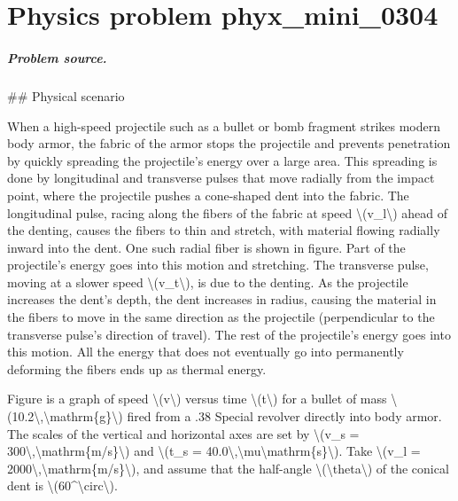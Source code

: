 
\chapter{Physics problem phyx\_mini\_0304}
\label{ch:PhyXMiniProblems_problem_phyx_mini_0304}

\paragraph{Problem source.}
\#\# Physical scenario

When a high-speed projectile such as a bullet or bomb fragment strikes modern body armor, the fabric of the armor stops the projectile and prevents penetration by quickly spreading the projectile's energy over a large area. This spreading is done by longitudinal and transverse pulses that move radially from the impact point, where the projectile pushes a cone-shaped dent into the fabric. The longitudinal pulse, racing along the fibers of the fabric at speed \textbackslash{}(v\_l\textbackslash{}) ahead of the denting, causes the fibers to thin and stretch, with material flowing radially inward into the dent. One such radial fiber is shown in figure. Part of the projectile's energy goes into this motion and stretching. The transverse pulse, moving at a slower speed \textbackslash{}(v\_t\textbackslash{}), is due to the denting. As the projectile increases the dent's depth, the dent increases in radius, causing the material in the fibers to move in the same direction as the projectile (perpendicular to the transverse pulse's direction of travel). The rest of the projectile's energy goes into this motion. All the energy that does not eventually go into permanently deforming the fibers ends up as thermal energy.

Figure is a graph of speed \textbackslash{}(v\textbackslash{}) versus time \textbackslash{}(t\textbackslash{}) for a bullet of mass \textbackslash{}(10.2\textbackslash{},\textbackslash{}mathrm\{g\}\textbackslash{}) fired from a .38 Special revolver directly into body armor. The scales of the vertical and horizontal axes are set by \textbackslash{}(v\_s = 300\textbackslash{},\textbackslash{}mathrm\{m/s\}\textbackslash{}) and \textbackslash{}(t\_s = 40.0\textbackslash{},\textbackslash{}mu\textbackslash{}mathrm\{s\}\textbackslash{}). Take \textbackslash{}(v\_l = 2000\textbackslash{},\textbackslash{}mathrm\{m/s\}\textbackslash{}), and assume that the half-angle \textbackslash{}(\textbackslash{}theta\textbackslash{}) of the conical dent is \textbackslash{}(60\textasciicircum{}\textbackslash{}circ\textbackslash{}).

